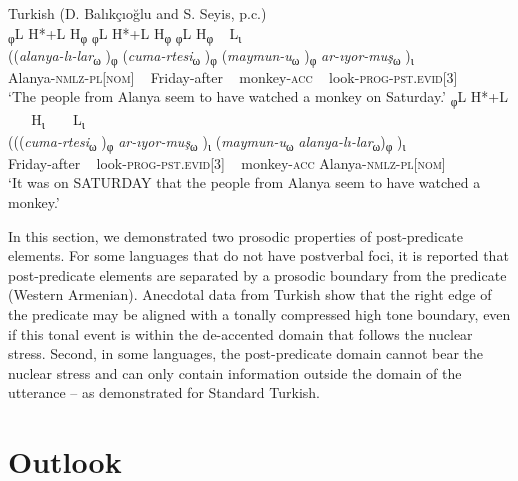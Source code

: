 \documentclass[output=paper,colorlinks,citecolor=brown]{langscibook}
\begin{document}
\ea \label{ex:turkishSOAdvV}
    Turkish (D. Balıkçıoğlu and S. Seyis, p.c.) \\
    \ea 
        \glll \textup{\textsubscript{φ}L{ }H*+L} \textup{H\textsubscript{φ}} \textup{\textsubscript{φ}L{ }H*+L} \textup{H\textsubscript{φ}} \textup{\textsubscript{φ}L} \textup{H\textsubscript{φ}} ~ \textup{L\textsubscript{ι}} \\
            ((\textit{alanya-lı-lar}\textsubscript{ω} )\textsubscript{φ} (\textit{cuma-rtesi}\textsubscript{ω} )\textsubscript{φ} (\textit{maymun-u}\textsubscript{ω} )\textsubscript{φ}	\textit{ar-ıyor-muş}\textsubscript{ω} )\textsubscript{ι}\\
            Alanya-\textsc{nmlz-pl[nom]} ~	Friday-after ~ monkey-\textsc{acc} ~ look-\textsc{prog-pst.evid[3]}\\
            \glt ‘The people from Alanya seem to have watched a monkey on Saturday.’
    \ex 
            \glll \textup{\textsubscript{φ}L{ }H*+L} ~ ~ \textup{H\textsubscript{ι}} ~ ~ \textup{L\textsubscript{ι}} \\
            (((\textit{cuma-rtesi}\textsubscript{ω} )\textsubscript{φ} \textit{ar-ıyor-muş}\textsubscript{ω} )\textsubscript{ι} (\textit{maymun-u}\textsubscript{ω} \textit{alanya-lı-lar}\textsubscript{ω})\textsubscript{φ} )\textsubscript{ι}\\
            Friday-after ~ look-\textsc{prog-pst.evid[3]} ~ monkey-\textsc{acc} Alanya-\textsc{nmlz-pl[nom]} 	\\
            \glt ‘It was on SATURDAY that the people from Alanya seem to have watched a monkey.’
    \z
\z

 

In this section, we demonstrated two prosodic properties of post-predicate elements. For some languages that do not have postverbal foci, it is reported that post-predicate elements are separated by a prosodic boundary from the predicate (Western Armenian). Anecdotal data from Turkish show that the right edge of the predicate may be aligned with a tonally compressed high tone boundary, even if this tonal event is within the de-accented domain that follows the nuclear stress. Second, in some languages, the post-predicate domain cannot bear the nuclear stress and can only contain information outside the  domain of the utterance -- as demonstrated for Standard Turkish.


\section{Outlook} \label{sec:summary}
\end{document}
